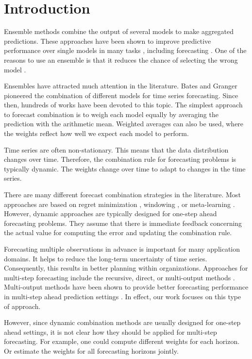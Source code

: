 \documentclass[smallcondensed]{svjour3}
\begin{document}
\section{Introduction}\label{intro}

Ensemble methods combine the output of several models to make aggregated predictions. These approaches have been shown to improve predictive performance over single models in many tasks \cite{brown2005managing}, including forecasting \cite{cerqueira2017dets}. One of the reasons to use an ensemble is that it reduces the chance of selecting the wrong model \cite{hibon2005combine}.

Ensembles have attracted much attention in the literature. Bates and Granger \cite{bates1969combination} pioneered the combination of different models for time series forecasting. Since then, hundreds of works have been devoted to this topic. 
The simplest approach to forecast combination is to weigh each model equally by averaging the prediction with the arithmetic mean. Weighted averages can also be used, where the weights reflect how well we expect each model to perform.

Time series are often non-stationary. This means that the data distribution changes over time. Therefore, the combination rule for forecasting problems is typically dynamic. The weights change over time to adapt to changes in the time series.

There are many different forecast combination strategies in the literature. Most approaches are based on regret minimization \cite{Cesa-Bianchi:2006:PLG:1137817}, windowing \cite{Blast}, or meta-learning \cite{cerqueira2019arbitrage}.
However, dynamic approaches are typically designed for one-step ahead forecasting problems. They assume that there is immediate feedback concerning the actual value for computing the error and updating the combination rule.

Forecasting multiple observations in advance is important for many application domains. It helps to reduce the long-term uncertainty of time series. Consequently, this results in better planning within organizations. Approaches for multi-step forecasting include the recursive, direct, or multi-output methods \cite{taieb2012review}. Multi-output methods have been shown to provide better forecasting performance in multi-step ahead prediction settings \cite{taieb2012review}. In effect, our work focuses on this type of approach. 

However, since dynamic combination methods are usually designed for one-step ahead settings, it is not clear how they should be applied for multi-step forecasting. 
For example, one could compute different weights for each horizon. Or estimate the weights for all forecasting horizons jointly.
\end{document}
